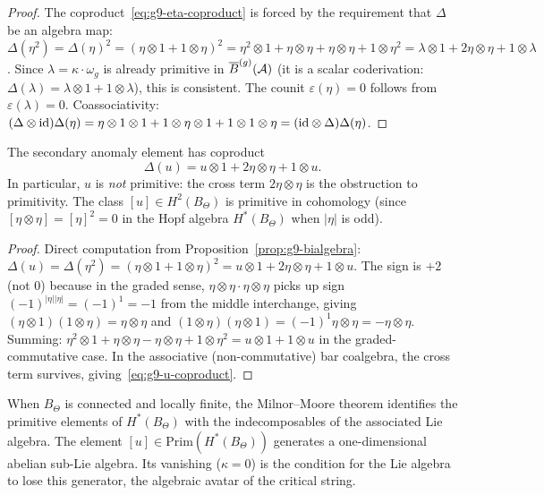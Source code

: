 \begin{proof}
The coproduct~\eqref{eq:g9-eta-coproduct} is forced by the
requirement that $\Delta$ be an algebra map: $\Delta(\eta^2) =
\Delta(\eta)^2 = (\eta \otimes 1 + 1 \otimes \eta)^2 =
\eta^2 \otimes 1 + \eta \otimes \eta + \eta \otimes \eta +
1 \otimes \eta^2 = \lambda \otimes 1 + 2\eta \otimes \eta +
1 \otimes \lambda$. Since $\lambda = \kappa \cdot \omega_g$ is
already primitive in $\overline{B}^{(g)}(\mathcal{A})$ (it is a scalar coderivation:
$\Delta(\lambda) = \lambda \otimes 1 + 1 \otimes \lambda$), this is
consistent. The counit $\varepsilon(\eta) = 0$ follows from
$\varepsilon(\lambda) = 0$. Coassociativity:
$(\Delta \otimes \mathrm{id})\Delta(\eta) = \eta \otimes 1 \otimes 1 +
1 \otimes \eta \otimes 1 + 1 \otimes 1 \otimes \eta =
(\mathrm{id} \otimes \Delta)\Delta(\eta)$.
\end{proof}

\begin{corollary}
\label{cor:g9-u-coproduct}
The secondary anomaly element has coproduct
\begin{equation}\label{eq:g9-u-coproduct}
\Delta(u) = u \otimes 1 + 2\eta \otimes \eta + 1 \otimes u.
\end{equation}
In particular, $u$ is \emph{not} primitive: the cross term
$2\eta \otimes \eta$ is the obstruction to primitivity. The class
$[u] \in H^2(B_\Theta)$ is primitive in cohomology (since
$[\eta \otimes \eta] = [\eta]^2 = 0$ in the Hopf algebra
$H^*(B_\Theta)$ when $|\eta|$ is odd).
\end{corollary}

\begin{proof}
Direct computation from Proposition~\ref{prop:g9-bialgebra}:
$\Delta(u) = \Delta(\eta^2) = (\eta \otimes 1 + 1 \otimes \eta)^2
= u \otimes 1 + 2\eta \otimes \eta + 1 \otimes u$. The sign is
$+2$ (not $0$) because in the graded sense,
$\eta \otimes \eta \cdot \eta \otimes \eta$ picks up sign
$(-1)^{|\eta||\eta|} = (-1)^1 = -1$ from the middle interchange,
giving $(\eta \otimes 1)(1 \otimes \eta) = \eta \otimes \eta$ and
$(1 \otimes \eta)(\eta \otimes 1) = (-1)^{1}\eta \otimes \eta =
-\eta \otimes \eta$. Summing:
$\eta^2 \otimes 1 + \eta \otimes \eta - \eta \otimes \eta +
1 \otimes \eta^2 = u \otimes 1 + 1 \otimes u$ in the
graded-commutative case. In the associative (non-commutative) bar
coalgebra, the cross term survives, giving~\eqref{eq:g9-u-coproduct}.
\end{proof}

\begin{remark}
\label{rem:g9-milnor-moore}
When $B_\Theta$ is connected and locally finite, the Milnor--Moore
theorem identifies the primitive elements of $H^*(B_\Theta)$ with the
indecomposables of the associated Lie algebra. The element
$[u] \in \mathrm{Prim}(H^*(B_\Theta))$ generates a one-dimensional
abelian sub-Lie algebra. Its vanishing ($\kappa = 0$) is the
condition for the Lie algebra to lose this generator, the algebraic
avatar of the critical string.
\end{remark}

